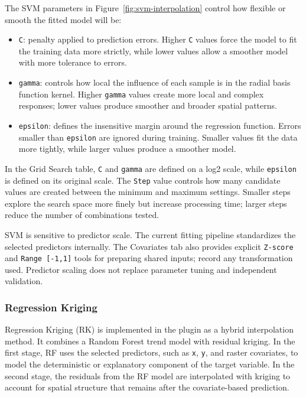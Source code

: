 \documentclass[11pt,a4paper]{article}
\begin{document}
The SVM parameters in Figure~\ref{fig:svm-interpolation} control how flexible or smooth the fitted model will be:


\begin{itemize}
    \item \texttt{C}: penalty applied to prediction errors. Higher \texttt{C} values force the model to fit the training data more strictly, while lower values allow a smoother model with more tolerance to errors.


    \item \texttt{gamma}: controls how local the influence of each sample is in the radial basis function kernel. Higher \texttt{gamma} values create more local and complex responses; lower values produce smoother and broader spatial patterns.


    \item \texttt{epsilon}: defines the insensitive margin around the regression function. Errors smaller than \texttt{epsilon} are ignored during training. Smaller values fit the data more tightly, while larger values produce a smoother model.
\end{itemize}


In the Grid Search table, \texttt{C} and \texttt{gamma} are defined on a log2 scale, while \texttt{epsilon} is defined on its original scale. The \texttt{Step} value controls how many candidate values are created between the minimum and maximum settings. Smaller steps explore the search space more finely but increase processing time; larger steps reduce the number of combinations tested.


\begin{infobox}
SVM is sensitive to predictor scale. The current fitting pipeline standardizes the selected predictors internally. The Covariates tab also provides explicit \texttt{Z-score} and \texttt{Range [-1,1]} tools for preparing shared inputs; record any transformation used. Predictor scaling does not replace parameter tuning and independent validation.
\end{infobox}


\subsubsection{Regression Kriging}


Regression Kriging (RK) is implemented in the plugin as a hybrid interpolation method. It combines a Random Forest trend model with residual kriging. In the first stage, RF uses the selected predictors, such as \texttt{x}, \texttt{y}, and raster covariates, to model the deterministic or explanatory component of the target variable. In the second stage, the residuals from the RF model are interpolated with kriging to account for spatial structure that remains after the covariate-based prediction.
\end{document}
